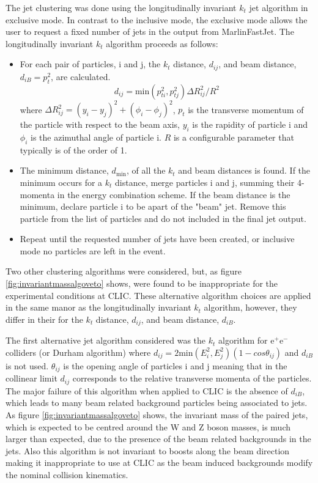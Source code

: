 The jet clustering was done using the longitudinally invariant $k_{t}$ jet algorithm in exclusive mode.  In contrast to the inclusive mode, the exclusive mode allows the user to request a fixed number of jets in the output from MarlinFastJet.  The longitudinally invariant $k_{t}$ algorithm proceeds as follows:
\begin{itemize}
\item For each pair of particles, i and j, the $k_{t}$ distance, $d_{ij}$, and beam distance, $d_{iB} = p_{t}^{2}$, are calculated.
\begin{equation}
d_{ij} = \text{min}(p_{ti}^{2}, p_{tj}^{2}){\Delta}R^{2}_{ij}/R^{2}
\end{equation}
where ${\Delta}R^{2}_{ij} = (y_{i} - y_{j})^2 + (\phi_{i} - \phi_{j})^2$, $p_{t}$ is the transverse momentum of the particle with respect to the beam axis, $y_{i}$ is the rapidity of particle i and $\phi_{i}$ is the azimuthal angle of particle i. $R$ is a configurable parameter that typically is of the order of 1.
\item The minimum distance, $d_\text{min}$, of all the $k_{t}$ and beam distances is found.  If the minimum occurs for a $k_{t}$ distance, merge particles i and j, summing their 4-momenta in the energy combination scheme.  If the beam distance is the minimum, declare particle i to be apart of the "beam" jet.  Remove this particle from the list of particles and do not included in the final jet output.
\item Repeat until the requested number of jets have been created, or inclusive mode no particles are left in the event.
\end{itemize}

Two other clustering algorithms were considered, but, as figure \ref{fig:invariantmassalgoveto} shows, were found to be inappropriate for the experimental conditions at CLIC.  These alternative algorithm choices are applied in the same manor as the longitudinally invariant $k_{t}$ algorithm, however, they differ in their for the $k_{t}$ distance, $d_{ij}$, and beam distance, $d_{iB}$.

The first alternative jet algorithm considered was the $k_{t}$ algorithm for $\text{e}^{+}\text{e}^{-}$ colliders (or Durham algorithm) where $d_{ij} = 2\text{min}(E_{i}^{2}, E_{j}^{2})(1-cos\theta_{ij})$ and $d_{iB}$ is not used.  $\theta_{ij}$ is the opening angle of particles i and j meaning that in the collinear limit $d_{ij}$ corresponds to the relative transverse momenta of the particles.  The major failure of this algorithm when applied to CLIC is the absence of $d_{iB}$, which leads to many beam related background particles being associated to jets.  As figure \ref{fig:invariantmassalgoveto} shows, the invariant mass of the paired jets, which is expected to be centred around the W and Z boson masses, is much larger than expected, due to the presence of the beam related backgrounds in the jets.  Also this algorithm is not invariant to boosts along the beam direction making it inappropriate to use at CLIC as the beam induced backgrounds modify the nominal collision kinematics.  

